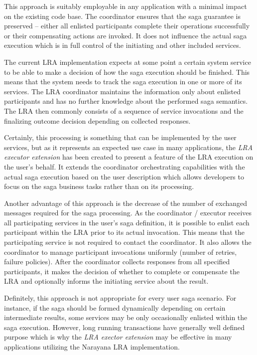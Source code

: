 \documentclass[oneside,
  digital, %
  table,   %
  nolof,     %
  nolot,     %
]{fithesis3}
\begin{document}
This approach is suitably employable in any application with a minimal impact on the existing code base. The coordinator ensures that the saga guarantee is preserved -- either all enlisted participants complete their operations successfully or their compensating actions are invoked. It does not influence the actual saga execution which is in full control of the initiating and other included services.

The current LRA implementation expects at some point a certain system service to be able to make a decision of how the saga execution should be finished. This means that the system needs to track the saga execution in one or more of its services. The LRA coordinator maintains the information only about enlisted participants and has no further knowledge about the performed saga semantics. The LRA then commonly consists of a sequence of service invocations and the finalizing outcome decision depending on collected responses.

Certainly, this processing is something that can be implemented by the user services, but as it represents an expected use case in many applications, the \textit{LRA executor extension} has been created to present a feature of the LRA execution on the user's behalf. It extends the coordinator orchestrating capabilities with the actual saga execution based on the user description which allows developers to focus on the saga business tasks rather than on its processing.

Another advantage of this approach is the decrease of the number of exchanged messages required for the saga processing. As the coordinator / executor receives all participating services in the user's saga definition, it is possible to enlist each participant within the LRA prior to its actual invocation. This means that the participating service is not required to contact the coordinator. It also allows the coordinator to manage participant invocations uniformly (number of retries, failure policies). After the coordinator collects responses from all specified participants, it makes the decision of whether to complete or compensate the LRA and optionally informs the initiating service about the result.

Definitely, this approach is not appropriate for every user saga scenario. For instance, if the saga should be formed dynamically depending on certain intermediate results, some services may be only occasionally enlisted within the saga execution. However, long running transactions have generally well defined purpose which is why the \textit{LRA exector extension} may be effective in many applications utilizing the Narayana LRA implementation.
\end{document}
